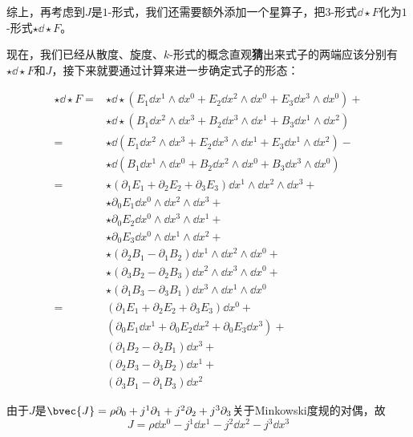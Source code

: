 综上，再考虑到$J$是$1$-形式，我们还需要额外添加一个星算子，把$3$-形式$\dd \star F$化为$1$-形式$\star \dd \star F$。

现在，我们已经从散度、旋度、$k$-形式的概念直观\textbf{猜}出来式子的两端应该分别有$\star \dd \star F$和$J$，接下来就要通过计算来进一步确定式子的形态：


\begin{equation}
    \begin{aligned}
        \star \dd \star F ={}& \star \dd \star (E_1\dd x^1\wedge \dd x^0 + E_2\dd x^2\wedge \dd x^0 + E_3\dd x^3\wedge \dd x^0)+\\
        & \star \dd \star (B_1\dd x^2\wedge \dd x^3+B_2\dd x^3\wedge \dd x^1 + B_3\dd x^1\wedge \dd x^2)\\
        ={}
        & \star \dd (E_1\dd x^2\wedge \dd x^3 + E_2\dd x^3\wedge \dd x^1 + E_3\dd x^1\wedge \dd x^2)-\\
        & \star \dd (B_1\dd x^1\wedge \dd x^0 + B_2\dd x^2\wedge \dd x^0 + B_3\dd x^3\wedge \dd x^0)\\
        ={}
        & \star (\partial_1E_1+\partial_2E_2+\partial_3E_3)\dd x^1\wedge \dd x^2\wedge \dd x^3+\\
        & \star \partial_0E_1\dd x^0\wedge \dd x^2\wedge \dd x^3 +\\
        & \star \partial_0E_2\dd x^0\wedge \dd x^3\wedge \dd x^1 +\\
        & \star \partial_0E_3\dd x^0\wedge \dd x^1\wedge \dd x^2+\\
        & \star (\partial_2B_1-\partial_1B_2)\dd x^1\wedge \dd x^2 \wedge \dd x^0+\\
        & \star (\partial_3B_2-\partial_2B_3)\dd x^2\wedge \dd x^3 \wedge \dd x^0+\\
        & \star (\partial_1B_3-\partial_3B_1)\dd x^3\wedge \dd x^1 \wedge \dd x^0\\
        ={}
        & (\partial_1E_1+\partial_2E_2+\partial_3E_3)\dd x^0+\\
        & (\partial_0 E_1\dd x^1+\partial_0 E_2\dd x^2+\partial_0 E_3\dd x^3)+\\
        & (\partial_1B_2-\partial_2B_1)\dd x^3+\\
        & (\partial_2B_3-\partial_3B_2)\dd x^1+\\
        & (\partial_3B_1-\partial_1B_3)\dd x^2
    \end{aligned}
\end{equation}

由于$J$是$\bvec{J}=\rho\partial_0+j^1\partial_1+j^2\partial_2+j^3\partial_3$关于Minkowski度规的对偶，故
\begin{equation}
J = \rho\dd x^0 - j^1\dd x^1 - j^2\dd x^2 - j^3\dd x^3
\end{equation}

